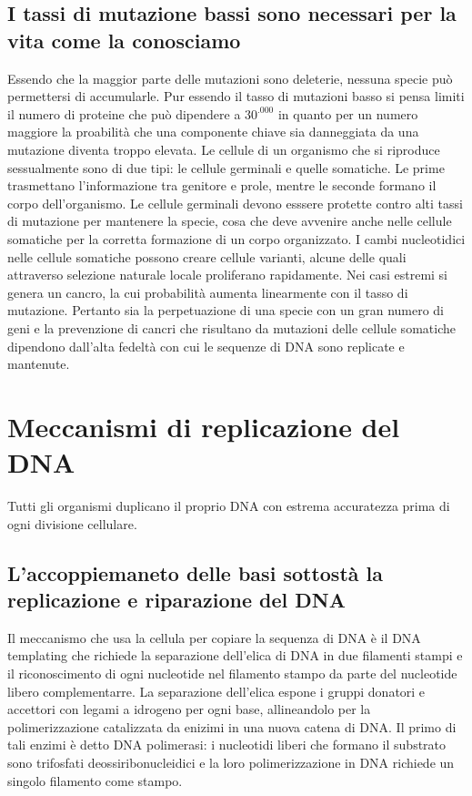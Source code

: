 \subsection{I tassi di mutazione bassi sono necessari per la vita come la conosciamo}
Essendo che la maggior parte delle mutazioni sono deleterie, nessuna specie pu\`o permettersi di accumularle. Pur essendo il tasso di mutazioni basso si pensa limiti il numero di 
proteine che pu\`o dipendere a $30^.000$ in quanto per un numero maggiore la proabilit\`a che una componente chiave sia danneggiata da una mutazione diventa troppo elevata. Le cellule di
un organismo che si riproduce sessualmente sono di due tipi: le cellule germinali e quelle somatiche. Le prime trasmettano l'informazione tra genitore e prole, mentre le seconde formano
il corpo dell'organismo. Le cellule germinali devono esssere protette contro alti tassi di mutazione per mantenere la specie, cosa che deve avvenire anche nelle cellule somatiche per 
la corretta formazione di un corpo organizzato. I cambi nucleotidici nelle cellule somatiche possono creare cellule varianti, alcune delle quali attraverso selezione naturale locale
proliferano rapidamente. Nei casi estremi si genera un cancro, la cui probabilit\`a aumenta linearmente con il tasso di mutazione. Pertanto sia la perpetuazione di una specie con un 
gran numero di geni e la prevenzione di cancri che risultano da mutazioni delle cellule somatiche dipendono dall'alta fedelt\`a con cui le sequenze di DNA sono replicate e mantenute. 
\section{Meccanismi di replicazione del DNA}
Tutti gli organismi duplicano il proprio DNA con estrema accuratezza prima di ogni divisione cellulare.
\subsection{L'accoppiemaneto delle basi sottost\`a la replicazione e riparazione del DNA}
Il meccanismo che usa la cellula per copiare la sequenza di DNA \`e il DNA templating che richiede la separazione dell'elica di DNA in due filamenti stampi e il riconoscimento di ogni
nucleotide nel filamento stampo da parte del nucleotide libero complementarre. La separazione dell'elica espone i gruppi donatori e accettori con legami a idrogeno per ogni base, 
allineandolo per la polimerizzazione catalizzata da enizimi in una nuova catena di DNA. Il primo di tali enzimi \`e detto DNA polimerasi: i nucleotidi liberi che formano il substrato 
sono trifosfati deossiribonucleidici e la loro polimerizzazione in DNA richiede un singolo filamento come stampo. 
